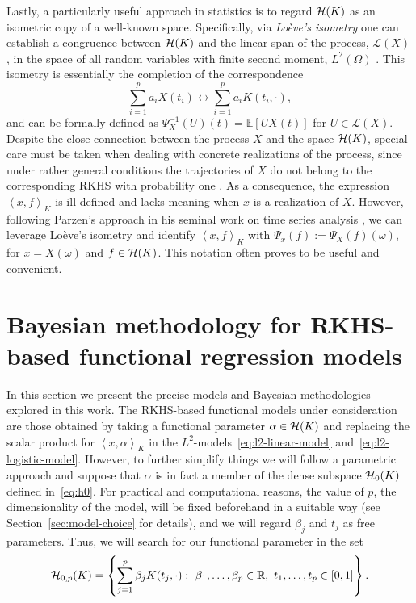 \documentclass[ba]{imsart}
\numberwithin{equation}{section}
\theoremstyle{plain}
\newcommand{\R}{\mathbb{R}}
\newcommand{\E}{\mathbb{E}}
\newcommand{\Hcal}{\ensuremath\mathcal{H}}
\newcommand\dotprod[2]{\left\langle #1, #2 \right\rangle}
\begin{document}
Lastly, a particularly useful approach in statistics is to regard \(\Hcal(K)\) as an isometric copy of a well-known space. Specifically, via \textit{Loève's isometry} one can establish a congruence between \(\Hcal(K)\) and the linear span of the process, \(\mathcal L(X)\), in the space of all random variables with finite second moment, \(L^2(\Omega)\) \citep[see Lemma 1.1 in][]{lukic2001stochastic}. This isometry is essentially the completion of the correspondence
  \[
  \sum_{i=1}^p a_i X(t_i) \longleftrightarrow \sum_{i=1}^p a_i K(t_i, \cdot),
\]
and can be formally defined as \(\Psi^{-1}_X(U)(t) = \E[U X(t)]\) for \(U \in \mathcal L(X)\).
Despite the close connection between the process \(X\) and the space \(\Hcal(K)\), special care must be taken when dealing with concrete realizations of the process, since under rather general conditions the trajectories of \(X\) do not belong to the corresponding RKHS with probability one \citep[see for example][Cor.~7.1]{lukic2001stochastic}. As a consequence, the expression \(\dotprod{x}{f}_K\) is ill-defined and lacks meaning when \(x\) is a realization of \(X\). However, following Parzen's approach in his seminal work on time series analysis \citep[Th.~4E]{parzen1961approach}, we can leverage Loève's isometry and identify \(\dotprod{x}{f}_K \) with \( \Psi_x(f) := \Psi_X(f)(\omega)\), for \(x=X(\omega)\) and \(f\in \Hcal(K)\). This notation often proves to be useful and convenient.

\section{Bayesian methodology for RKHS-based functional regression models}\label{sec:methodology}

In this section we present the precise models and Bayesian methodologies explored in this work. The RKHS-based functional models under consideration are those obtained by taking a functional parameter \(\alpha \in \Hcal(K)\) and replacing the scalar product for \(\dotprod{x}{\alpha}_K\) in the \(L^2\)-models~\eqref{eq:l2-linear-model} and~\eqref{eq:l2-logistic-model}. However, to further simplify things we will follow a parametric approach and suppose that \(\alpha\) is in fact a member of the dense subspace \(\Hcal_0(K)\) defined in~\eqref{eq:h0}. For practical and computational reasons, the value of \(p\), the dimensionality of the model, will be fixed beforehand in a suitable way (see Section~\ref{sec:model-choice} for details), and we will regard \(\beta_j\) and \(t_j\) as free parameters. Thus, we will search for our functional parameter in the set
\begin{equation}\label{eq:h0p}
\Hcal_{0,p}(K)=\left\{ \sum_{j=1}^p \beta_j K(t_j, \cdot): \ \beta_1,\dots,\beta_p \in \R, \ t_1,\dots,t_p \in [0, 1]\right\}.
\end{equation}
\end{document}
